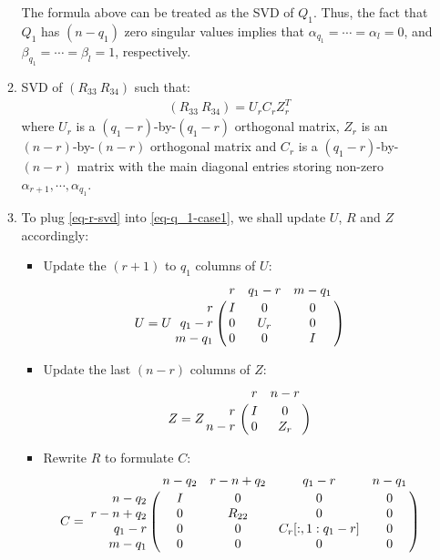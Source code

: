 \begin{enumerate}
\begin{enumerate}
                    The formula above can be treated as the SVD of $Q_1$. Thus, the fact that $Q_1$ has $(n-q_1)$ zero singular values implies that $\alpha_{q_1} = \cdots = \alpha_{l} = 0$, and $\beta_{q_1} = \cdots = \beta_{l} = 1$, respectively. 
                \item SVD of $(R_{33} \ R_{34})$ such that:
                    \begin{align} \label{eq-r-svd}
                        (R_{33} \ R_{34}) = U_{r}C_{r}Z_{r}^{T}
                    \end{align}   
                    where $U_{r}$ is a $(q_1-r)$-by-$(q_1-r)$ orthogonal matrix, $Z_{r}$ is an $(n-r)$-by-$(n-r)$ orthogonal matrix and $C_{r}$ is a $(q_1-r)$-by-$(n-r)$ matrix with the main diagonal entries storing non-zero $\alpha_{r+1}, \cdots, \alpha_{q_1}$.
                    \item To plug \eqref{eq-r-svd} into \eqref{eq-q_1-case1}, we shall update $U$, $R$ and $Z$ accordingly:
                        \begin{itemize}
                            \item Update the $(r+1)$ to $q_1$ columns of $U$:
                                \begin{displaymath}
                                    U = U\bordermatrix{ & r & q_1-r & m-q_1 \cr
                                    \hfill r & I & 0 & 0 \cr
                                    \hfill q_1-r & 0 & U_{r} & 0 \cr
                                    \hfill m-q_1 & 0 & 0 & I}
                                \end{displaymath}
                            \item Update the last $(n-r)$ columns of $Z$:
                                \begin{displaymath}
                                    Z = Z\bordermatrix{ & r & n-r \cr
                                    \hfill r & I & 0 \cr
                                    \hfill n-r & 0 & Z_{r}}
                                \end{displaymath}
                            \item Rewrite $R$ to formulate $C$:
                                \begin{displaymath}
                                    C = \bordermatrix{ & n-q_2 & r-n+q_2 & q_1-r & n-q_1 \cr
                                    \hfill n-q_2 & I & 0 & 0 & 0 \cr
                                    \hfill r-n+q_2 & 0 & R_{22} & 0 & 0 \cr
                                    \hfill q_1-r & 0 & 0 & C_{r}[:,1:q_1-r] & 0 \cr
                                    \hfill m-q_1 & 0 & 0 & 0 & 0}
                                \end{displaymath}
                        \end{itemize}
                    

\end{enumerate}
\end{enumerate}
